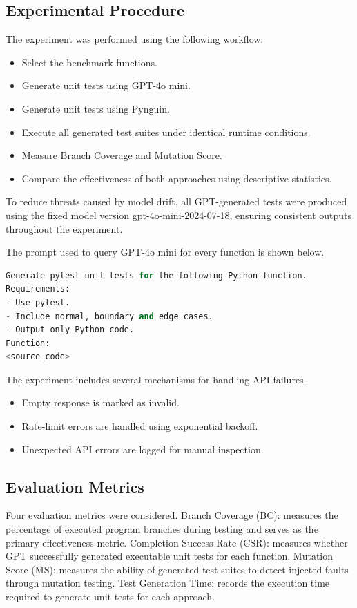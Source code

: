 \documentclass[conference]{IEEEtran}
\begin{document}
\subsection{Experimental Procedure}
The experiment was performed using the following workflow:
\begin{itemize}
\item Select the benchmark functions.
\item Generate unit tests using GPT-4o mini.
\item Generate unit tests using Pynguin.
\item Execute all generated test suites under identical runtime conditions.
\item Measure Branch Coverage and Mutation Score.
\item Compare the effectiveness of both approaches using descriptive statistics.
\end{itemize}
To reduce threats caused by model drift, all GPT-generated tests were produced using the fixed model version gpt-4o-mini-2024-07-18, ensuring consistent outputs throughout the experiment.

The prompt used to query GPT-4o mini for every function is shown below.
\begin{lstlisting}[language=Python]
Generate pytest unit tests for the following Python function.
Requirements:
- Use pytest.
- Include normal, boundary and edge cases.
- Output only Python code.
Function:
<source_code>
\end{lstlisting}

The experiment includes several mechanisms for handling API failures.
\begin{itemize}
    \item Empty response is marked as invalid.
    \item Rate-limit errors are handled using exponential backoff.
    \item Unexpected API errors are logged for manual inspection.
\end{itemize}
\subsection{Evaluation Metrics}
Four evaluation metrics were considered.
Branch Coverage (BC): measures the percentage of executed program branches during testing and serves as the primary effectiveness metric.
Completion Success Rate (CSR): measures whether GPT successfully generated executable unit tests for each function.
Mutation Score (MS): measures the ability of generated test suites to detect injected faults through mutation testing.
Test Generation Time: records the execution time required to generate unit tests for each approach.
\end{document}
